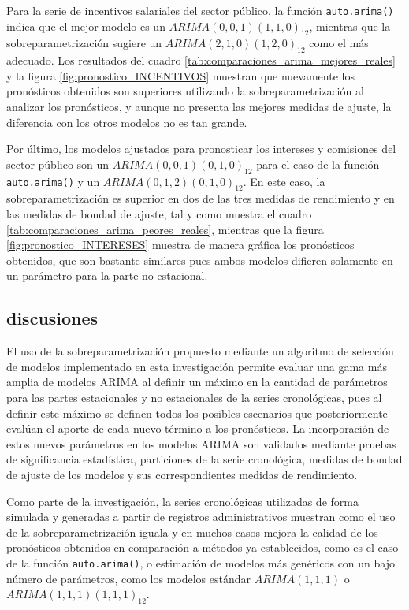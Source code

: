 \documentclass[
]{article}
\begin{document}
Para la serie de incentivos salariales del sector público, la función
\texttt{auto.arima()} indica que el mejor modelo es un
\(ARIMA(0,0,1)(1,1,0)_{12}\), mientras que la sobreparametrización
sugiere un \(ARIMA(2,1,0)(1,2,0)_{12}\) como el más adecuado. Los
resultados del cuadro \ref{tab:comparaciones_arima_mejores_reales} y la
figura \ref{fig:pronostico_INCENTIVOS} muestran que nuevamente los
pronósticos obtenidos son superiores utilizando la sobreparametrización
al analizar los pronósticos, y aunque no presenta las mejores medidas de
ajuste, la diferencia con los otros modelos no es tan grande.

Por último, los modelos ajustados para pronosticar los intereses y
comisiones del sector público son un \(ARIMA(0,0,1)(0,1,0)_{12}\) para
el caso de la función \texttt{auto.arima()} y un
\(ARIMA(0,1,2)(0,1,0)_{12}\). En este caso, la sobreparametrización es
superior en dos de las tres medidas de rendimiento y en las medidas de
bondad de ajuste, tal y como muestra el cuadro
\ref{tab:comparaciones_arima_peores_reales}, mientras que la figura
\ref{fig:pronostico_INTERESES} muestra de manera gráfica los pronósticos
obtenidos, que son bastante similares pues ambos modelos difieren
solamente en un parámetro para la parte no estacional.

\subsection{discusiones}

El uso de la sobreparametrización propuesto mediante un algoritmo de
selección de modelos implementado en esta investigación permite evaluar
una gama más amplia de modelos ARIMA al definir un máximo en la cantidad
de parámetros para las partes estacionales y no estacionales de la
series cronológicas, pues al definir este máximo se definen todos los
posibles escenarios que posteriormente evalúan el aporte de cada nuevo
término a los pronósticos. La incorporación de estos nuevos parámetros
en los modelos ARIMA son validados mediante pruebas de significancia
estadística, particiones de la serie cronológica, medidas de bondad de
ajuste de los modelos y sus correspondientes medidas de rendimiento.

Como parte de la investigación, la series cronológicas utilizadas de
forma simulada y generadas a partir de registros administrativos
muestran como el uso de la sobreparametrización iguala y en muchos casos
mejora la calidad de los pronósticos obtenidos en comparación a métodos
ya establecidos, como es el caso de la función \texttt{auto.arima()}, o
estimación de modelos más genéricos con un bajo número de parámetros,
como los modelos estándar \(ARIMA(1,1,1)\) o
\(ARIMA(1,1,1)(1,1,1)_{12}\).
\end{document}
